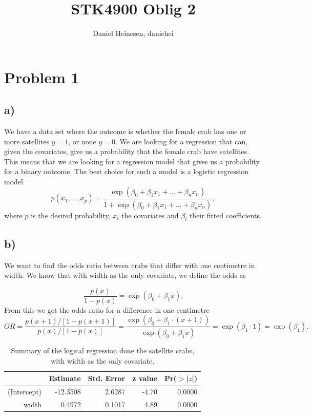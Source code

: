 \documentclass[a4paper,norsk, 10pt]{article}
\title{STK4900 Oblig 2}
\author{Daniel Heinesen, daniehei}
\begin{document}
\maketitle

\section{Problem 1}
\subsection{a)}
We have a data set where the outcome is whether the female crab has one or more satellites $y = 1$, or none $y=0$. We are looking for a regression that can, given the covariates, give us a probability that the female crab have satellites. This means that we are looking for a regression model that gives us a probability for a binary outcome. The best choice for such a model is a logistic regression model
\begin{equation}
p(x_1,...,x_p) = \frac{\exp(\beta_0 + \beta_1 x_1 + ... + \beta_n x_n)}{1+\exp(\beta_0 + \beta_1 x_1 + ... + \beta_n x_n)},
\end{equation}
where $p$ is the desired probability, $x_i$ the covariates and $\beta_i$ their fitted coefficients.

\subsection{b)}

We want to find the odds ratio between crabs that differ with one centimetre in width. We know that with width as the only covariate, we define the odds as 

\begin{equation}
\frac{p(x)}{1-p(x)} = \exp(\beta_0 + \beta_1 x).
\end{equation}
From this we get the odds ratio for a difference in one centimetre
\begin{equation}
OR = \frac{p(x+1)/[1-p(x+1)]}{p(x)/[1-p(x)]} = \frac{\exp(\beta_0 + \beta_1\cdot (x+1))}{\exp(\beta_0 + \beta_1 x)} = \exp(\beta_1\cdot 1) = \exp(\beta_1).
\end{equation}


\begin{table}[!ht]
\centering
\begin{tabular}{rrrrr}
  \hline
 & Estimate & Std. Error & z value & Pr($>$|$z$|) \\ 
  \hline
(Intercept) & -12.3508 & 2.6287 & -4.70 & 0.0000 \\ 
  width & 0.4972 & 0.1017 & 4.89 & 0.0000 \\ 
   \hline
\end{tabular}
\caption{Summary of the logical regression done the satellite crabs, with width as the only covariate.}\label{tab:crab_width}
\end{table}
\end{document}
